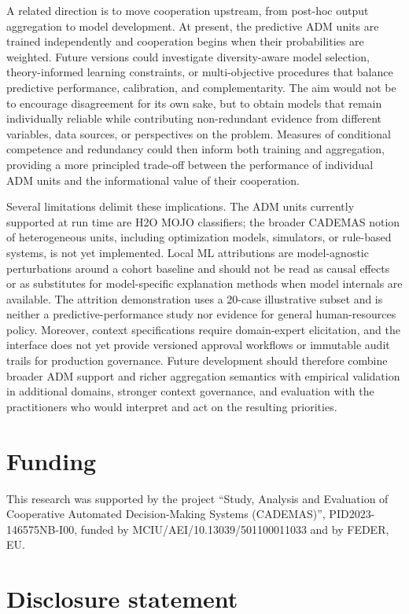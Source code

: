\documentclass{interact}
\begin{document}
A related direction is to move cooperation upstream, from post-hoc output aggregation to model development. At present, the predictive ADM units are trained independently and cooperation begins when their probabilities are weighted. Future versions could investigate diversity-aware model selection, theory-informed learning constraints, or multi-objective procedures that balance predictive performance, calibration, and complementarity. The aim would not be to encourage disagreement for its own sake, but to obtain models that remain individually reliable while contributing non-redundant evidence from different variables, data sources, or perspectives on the problem. Measures of conditional competence and redundancy could then inform both training and aggregation, providing a more principled trade-off between the performance of individual ADM units and the informational value of their cooperation.

Several limitations delimit these implications. The ADM units currently supported at run time are H2O MOJO classifiers; the broader CADEMAS notion of heterogeneous units, including optimization models, simulators, or rule-based systems, is not yet implemented. Local ML attributions are model-agnostic perturbations around a cohort baseline and should not be read as causal effects or as substitutes for model-specific explanation methods when model internals are available. The attrition demonstration uses a 20-case illustrative subset and is neither a predictive-performance study nor evidence for general human-resources policy. Moreover, context specifications require domain-expert elicitation, and the interface does not yet provide versioned approval workflows or immutable audit trails for production governance. Future development should therefore combine broader ADM support and richer aggregation semantics with empirical validation in additional domains, stronger context governance, and evaluation with the practitioners who would interpret and act on the resulting priorities.

\section*{Funding}

This research was supported by the project ``Study, Analysis and Evaluation of Cooperative Automated Decision-Making Systems (CADEMAS)'', PID2023-146575NB-I00, funded by MCIU/AEI/10.13039/501100011033 and by FEDER, EU.

\section*{Disclosure statement}
\end{document}
